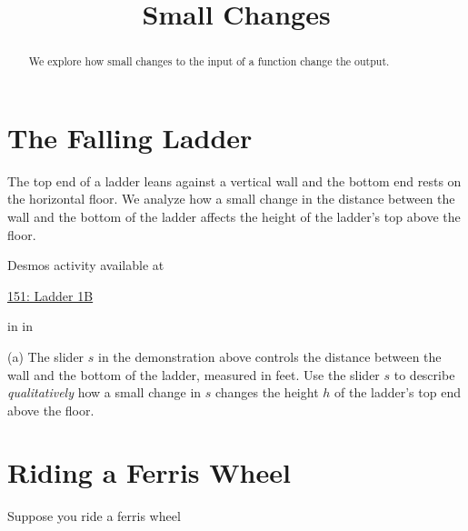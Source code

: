 \documentclass{ximera}
\title{Small Changes}
\newcommand{\pskip}{\vskip 0.1 in}
\begin{document}
\begin{abstract}
We explore how small changes to the input of a function change the output.
\end{abstract}
\maketitle


\section{The Falling Ladder}


\begin{example}   \label{Ex435rsfeetr}

The top end of a ladder leans against a vertical wall and the bottom end rests on the horizontal floor. We analyze how a small change in the distance between the wall and the bottom of the ladder affects the height of the ladder's top above the floor. 

 
\begin{onlineOnly}
    \begin{center}
\end{center}
\end{onlineOnly}

Desmos activity available at

\href{https://www.desmos.com/calculator/6at8gegn2b}{151: Ladder 1B}

\pskip \pskip

\begin{question}  \label{Qdsfesarr4}

(a) The slider $s$ in the demonstration above controls the distance between the wall and the bottom of the ladder, measured in feet. Use the slider $s$ to describe \emph{qualitatively} how a small change in $s$ changes the height $h$ of the ladder's top end above the floor.


\end{question}


\end{example}


\section{Riding a Ferris Wheel}


Suppose  you ride a ferris wheel
\end{document}
